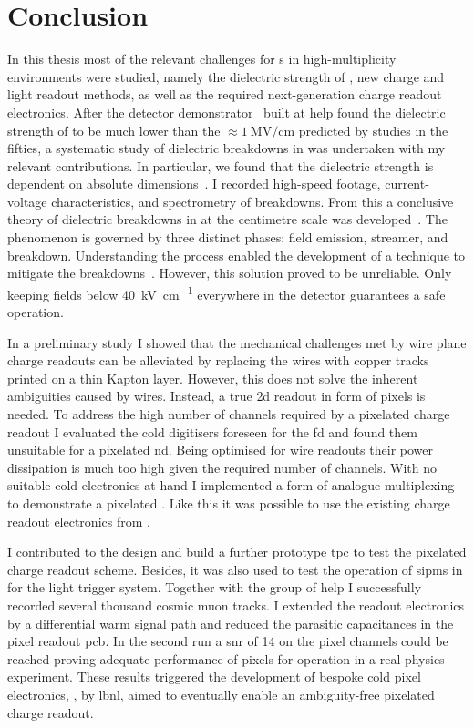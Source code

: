 \chapter{Conclusion}
\label{chap:conclusion}

In this thesis most of the relevant challenges for \lartpc{}s in high-multiplicity environments were studied, namely the dielectric strength of \lar{}, new charge and light readout methods, as well as the required next-generation charge readout electronics.
After the \AT{} detector demonstrator~\cite{AT} built at \gls{help} found the dielectric strength of \lar{} to be much lower than the $\approx \SI{1}{\mega\volt\per\centi\metre}$ predicted by studies in the fifties, a systematic study of dielectric breakdowns in \lar{} was undertaken with my relevant contributions.
In particular, we found that the dielectric strength is dependent on absolute dimensions~\cite{breakdown_14}.
I recorded high-speed footage, current-voltage characteristics, and spectrometry of breakdowns.
From this a conclusive theory of dielectric breakdowns in \lar{} at the centimetre scale was developed~\cite{breakdown_16}.
The phenomenon is governed by three distinct phases: field emission, streamer, and breakdown.
Understanding the process enabled the development of a technique to mitigate the breakdowns~\cite{latex}.
However, this solution proved to be unreliable.
Only keeping fields below \SI{40}{\kilo\volt\per\centi\metre} everywhere in the detector guarantees a safe operation.

In a preliminary study I showed that the mechanical challenges met by wire plane charge readouts can be alleviated by replacing the wires with copper tracks printed on a thin Kapton layer.
However, this does not solve the inherent ambiguities caused by wires.
Instead, a true \gls{2d} readout in form of pixels is needed.
To address the high number of channels required by a pixelated charge readout I evaluated the cold digitisers foreseen for the \dune{} \gls{fd} and found them unsuitable for a pixelated \gls{nd}.
Being optimised for wire readouts their power dissipation is much too high given the required number of channels.
With no suitable cold electronics at hand I implemented a form of analogue multiplexing to demonstrate a pixelated \lartpc{}.
Like this it was possible to use the existing charge readout electronics from \AT{}.

I contributed to the design and build a further prototype \gls{tpc} to test the pixelated charge readout scheme.
Besides, it was also used to test the operation of \glspl{sipm} in \lar{} for the light trigger system.
Together with the \lar{} group of \gls{help} I successfully recorded several thousand cosmic muon tracks.
I extended the \AT{} readout electronics by a differential warm signal path and reduced the parasitic capacitances in the pixel readout \gls{pcb}.
In the second run a \gls{snr} of \num{14} on the pixel channels could be reached proving adequate performance of pixels for operation in a real physics experiment.
These results triggered the development of bespoke cold pixel electronics, \larpix{}, by \gls{lbnl}, aimed to eventually enable an ambiguity-free pixelated \lartpc{} charge readout.

